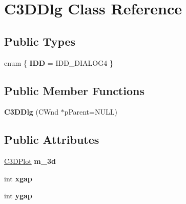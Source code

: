\hypertarget{class_c3_d_dlg}{\section{C3\-D\-Dlg Class Reference}
\label{class_c3_d_dlg}
}
\subsection*{Public Types}
\begin{DoxyCompactItemize}
\item 
enum \{ {\bfseries I\-D\-D} =  I\-D\-D\-\_\-\-D\-I\-A\-L\-O\-G4
 \}
\end{DoxyCompactItemize}
\subsection*{Public Member Functions}
\begin{DoxyCompactItemize}
\item 
\hypertarget{class_c3_d_dlg_a18d1dc05dd6994125a9cc74ea46d4234}{{\bfseries C3\-D\-Dlg} (C\-Wnd $\ast$p\-Parent=N\-U\-L\-L)}\label{class_c3_d_dlg_a18d1dc05dd6994125a9cc74ea46d4234}

\end{DoxyCompactItemize}
\subsection*{Public Attributes}
\begin{DoxyCompactItemize}
\item 
\hypertarget{class_c3_d_dlg_ae0a71f720c01099b57f4935cd57fdff4}{\hyperlink{class_c3_d_plot}{C3\-D\-Plot} {\bfseries m\-\_\-3d}}\label{class_c3_d_dlg_ae0a71f720c01099b57f4935cd57fdff4}

\item 
\hypertarget{class_c3_d_dlg_ad2f25d9c0a8a58605ccbdb12774e45d7}{int {\bfseries xgap}}\label{class_c3_d_dlg_ad2f25d9c0a8a58605ccbdb12774e45d7}

\item 
\hypertarget{class_c3_d_dlg_a2690b714c76eb5ca6552fce507a505a3}{int {\bfseries ygap}}\label{class_c3_d_dlg_a2690b714c76eb5ca6552fce507a505a3}

\end{DoxyCompactItemize}
